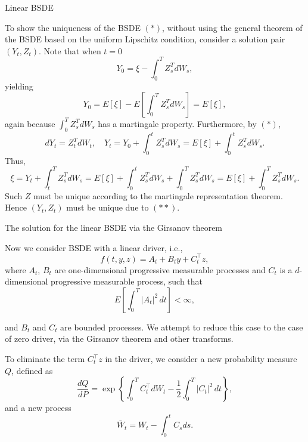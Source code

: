 \documentclass{beamer}
\begin{document}
\begin{frame}{Linear BSDE}

    {\footnotesize \footnotesize
    To show the uniqueness of the BSDE $(*)$, without using the general theorem of the BSDE based on the uniform Lipschitz condition, consider a solution pair \((Y_t, Z_t)\). Note that when \(t = 0\)
\[
Y_0 = \xi - \int_0^T Z_s^T dW_s,
\]
yielding
\[
Y_0 = E[\xi] - E \left[ \int_0^T Z_s^T dW_s \right] = E[\xi],
\]
again because \(\int_0^T Z_s^T dW_s\) has a martingale property. Furthermore, by $(*)$,
\[
dY_t = Z_t^T dW_t, \quad Y_t = 
Y_0 + \int_0^t Z_s^T dW_s = E[\xi] + \int_0^t Z_s^T dW_s. \tag{**}
\]
Thus,
\[
\xi = Y_t + \int_{t}^{T} Z_s^T dW_s
= E[\xi] + \int_{0}^{t} Z_s^T dW_s + \int_{0}^{T} Z_s^T dW_s
= E[\xi] + \int_{0}^{T} Z_s^T dW_s.
\]
Such \(Z\) must be unique according 
to the martingale representation theorem. Hence \((Y_t, Z_t)\) 
must be unique due to $(**)$.
    }
    
\end{frame}

\begin{frame}{The solution for the linear BSDE via the Girsanov theorem}

    {\footnotesize \footnotesize
    Now we consider BSDE with a linear driver, i.e.,
\[
f(t,y,z)=A_{t}+B_{t}y+C_{t}^{\top}z,
\]
where \(A_{t}\), \(B_{t}\) are one-dimensional progressive measurable 
processes and \(C_{t}\) is a \(d\)-dimensional progressive measurable process, 
such that
\[
E\left[\int_{0}^{T}|A_{t}|^{2}\,dt\right]<\infty,
\]
\par and \(B_{t}\) and \(C_{t}\) are bounded processes. 
We attempt to reduce this case to the case of zero driver, 
via the Girsanov theorem and other transforms.
\vspace{1em}
\par To eliminate the term \(C_{t}^{\top}z\) in the driver, we consider a new probability measure \(Q\), defined as
\[
\frac{dQ}{dP}=\exp\left\{\int_{0}^{T}C_{t}^{\top}dW_{t}-\frac{1}{2}\int_{0}^{T}| C_{t}|^{2}\,dt\right\},
\]
and a new process
\[
\bar{W}_{t}=W_{t}-\int_{0}^{t}C_{s}ds.
\]
    }
    
\end{frame}
\end{document}
